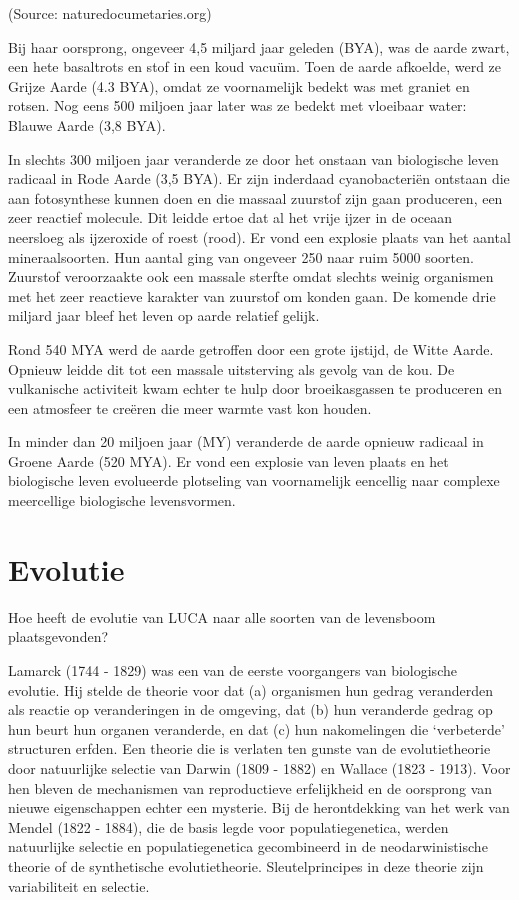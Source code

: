 \documentclass[
  11pt,
]{book}
\begin{document}
(Source: naturedocumetaries.org)

Bij haar oorsprong, ongeveer 4,5 miljard jaar geleden (BYA), was de aarde zwart, een hete basaltrots en stof in een koud vacuüm. Toen de aarde afkoelde, werd ze Grijze Aarde (4.3 BYA), omdat ze voornamelijk bedekt was met graniet en rotsen. Nog eens 500 miljoen jaar later was ze bedekt met vloeibaar water: Blauwe Aarde (3,8 BYA).

In slechts 300 miljoen jaar veranderde ze door het onstaan van biologische leven radicaal in Rode Aarde (3,5 BYA). Er zijn inderdaad cyanobacteriën ontstaan die aan fotosynthese kunnen doen en die massaal zuurstof zijn gaan produceren, een zeer reactief molecule. Dit leidde ertoe dat al het vrije ijzer in de oceaan neersloeg als ijzeroxide of roest (rood). Er vond een explosie plaats van het aantal mineraalsoorten. Hun aantal ging van ongeveer 250 naar ruim 5000 soorten. Zuurstof veroorzaakte ook een massale sterfte omdat slechts weinig organismen met het zeer reactieve karakter van zuurstof om konden gaan. De komende drie miljard jaar bleef het leven op aarde relatief gelijk.

Rond 540 MYA werd de aarde getroffen door een grote ijstijd, de Witte Aarde. Opnieuw leidde dit tot een massale uitsterving als gevolg van de kou. De vulkanische activiteit kwam echter te hulp door broeikasgassen te produceren en een atmosfeer te creëren die meer warmte vast kon houden.

In minder dan 20 miljoen jaar (MY) veranderde de aarde opnieuw radicaal in Groene Aarde (520 MYA). Er vond een explosie van leven plaats en het biologische leven evolueerde plotseling van voornamelijk eencellig naar complexe meercellige biologische levensvormen.

\hypertarget{evolutie}{%
\section{Evolutie}\label{evolutie}}

Hoe heeft de evolutie van LUCA naar alle soorten van de levensboom plaatsgevonden?

Lamarck (1744 - 1829) was een van de eerste voorgangers van biologische evolutie. Hij stelde de theorie voor dat (a) organismen hun gedrag veranderden als reactie op veranderingen in de omgeving, dat (b) hun veranderde gedrag op hun beurt hun organen veranderde, en dat (c) hun nakomelingen die `verbeterde' structuren erfden. Een theorie die is verlaten ten gunste van de evolutietheorie door natuurlijke selectie van Darwin (1809 - 1882) en Wallace (1823 - 1913). Voor hen bleven de mechanismen van reproductieve erfelijkheid en de oorsprong van nieuwe eigenschappen echter een mysterie. Bij de herontdekking van het werk van Mendel (1822 - 1884), die de basis legde voor populatiegenetica, werden natuurlijke selectie en populatiegenetica gecombineerd in de neodarwinistische theorie of de synthetische evolutietheorie. Sleutelprincipes in deze theorie zijn variabiliteit en selectie.
\end{document}
